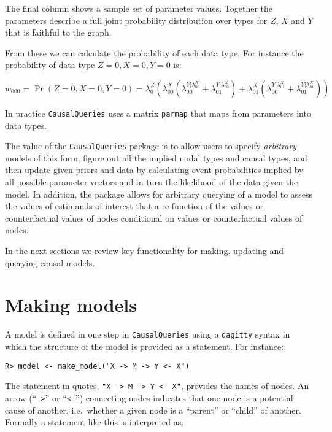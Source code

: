\documentclass[
  11pt,
  article]{jss}
\begin{document}
The final column shows a sample set of parameter values. Together the
parameters describe a full joint probability distribution over types for
\(Z\), \(X\) and \(Y\) that is faithful to the graph.

From these we can calculate the probability of each data type. For
instance the probability of data type \(Z=0, X=0, Y=0\) is:

\[w_{000}=\Pr(Z=0, X=0, Y=0) = \lambda^Z_0\left(\lambda^X_{00}(\lambda^{Y|\lambda^X_{00}}_{00}+\lambda^{Y|\lambda^X_{00}}_{01}) + \lambda^X_{01}(\lambda^{Y|\lambda^X_{01}}_{00}+\lambda^{Y|\lambda^X_{01}}_{01})\right)\]

In practice \texttt{CausalQueries} uses a matrix \texttt{parmap} that
maps from parameters into data types.

The value of the \texttt{CausalQueries} package is to allow users to
specify \emph{arbitrary} models of this form, figure out all the implied
nodal types and causal types, and then update given priors and data by
calculating event probabilities implied by all possible parameter
vectors and in turn the likelihood of the data given the model. In
addition, the package allows for arbitrary querying of a model to assess
the values of estimands of interest that a re function of the values or
counterfactual values of nodes conditional on values or counterfactual
values of nodes.

In the next sections we review key functionality for making, updating
and querying causal models.

\hypertarget{sec-make}{%
\section{Making models}\label{sec-make}}

A model is defined in one step in \texttt{CausalQueries} using a
\texttt{dagitty} syntax \citep{textor_robust_2016} in which the
structure of the model is provided as a statement. For instance:

\begin{verbatim}
R> model <- make_model("X -> M -> Y <- X")
\end{verbatim}

The statement in quotes,
\texttt{"X\ -\textgreater{}\ M\ -\textgreater{}\ Y\ \textless{}-\ X"},
provides the names of nodes. An arrow (``\texttt{-\textgreater{}}'' or
``\texttt{\textless{}-}'') connecting nodes indicates that one node is a
potential cause of another, i.e.~whether a given node is a ``parent'' or
``child'' of another. Formally a statement like this is interpreted as:
\end{document}
